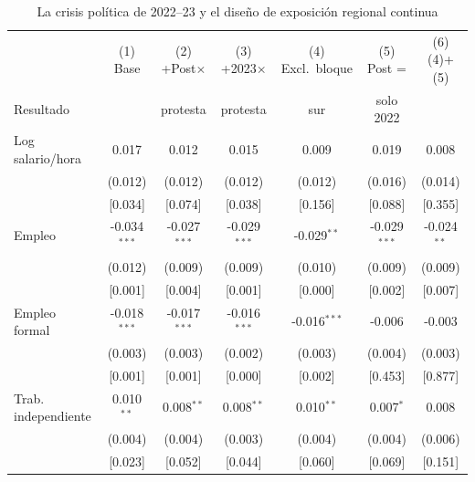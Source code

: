 \begin{table}[!tbp]\centering
\caption{La crisis política de 2022--23 y el diseño de exposición regional continua}\label{tab:crisis}
\begin{threeparttable}
\footnotesize
\setlength{\tabcolsep}{3pt}
\begin{tabular}{lcccccc}
\toprule
& (1) Base & (2) +Post$\times$ & (3) +2023$\times$ & (4) Excl.\ bloque & (5) Post = & (6) (4)+(5) \\
Resultado & & protesta & protesta & sur & solo 2022 & \\
\midrule
Log salario/hora & 0.017 & 0.012 & 0.015 & 0.009 & 0.019 & 0.008 \\
 & (0.012) & (0.012) & (0.012) & (0.012) & (0.016) & (0.014) \\
 & [0.034] & [0.074] & [0.038] & [0.156] & [0.088] & [0.355] \\
Empleo & -0.034$^{***}$ & -0.027$^{***}$ & -0.029$^{***}$ & -0.029$^{**}$ & -0.029$^{***}$ & -0.024$^{**}$ \\
 & (0.012) & (0.009) & (0.009) & (0.010) & (0.009) & (0.009) \\
 & [0.001] & [0.004] & [0.001] & [0.000] & [0.002] & [0.007] \\
Empleo formal & -0.018$^{***}$ & -0.017$^{***}$ & -0.016$^{***}$ & -0.016$^{***}$ & -0.006 & -0.003 \\
 & (0.003) & (0.003) & (0.002) & (0.003) & (0.004) & (0.003) \\
 & [0.001] & [0.001] & [0.000] & [0.002] & [0.453] & [0.877] \\
Trab. independiente & 0.010$^{**}$ & 0.008$^{**}$ & 0.008$^{**}$ & 0.010$^{**}$ & 0.007$^{*}$ & 0.008 \\
 & (0.004) & (0.004) & (0.003) & (0.004) & (0.004) & (0.006) \\
 & [0.023] & [0.052] & [0.044] & [0.060] & [0.069] & [0.151] \\
\bottomrule
\end{tabular}
\begin{tablenotes}\footnotesize

\end{tablenotes}
\end{threeparttable}
\end{table}

